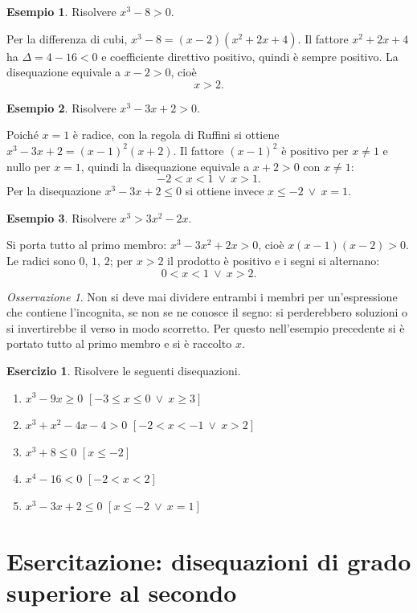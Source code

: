 \documentclass[12pt,a4paper,openany]{book}
\theoremstyle{definition}
\newtheorem{esempio}{Esempio}[section]
\newtheorem{esercizio}{Esercizio}[section]
\theoremstyle{plain}
\theoremstyle{remark}
\newtheorem*{osservazione}{Osservazione}
\begin{document}
\begin{esempio}
Risolvere $x^3-8>0$.

Per la differenza di cubi, $x^3-8=(x-2)(x^2+2x+4)$. Il fattore $x^2+2x+4$ ha $\Delta=4-16<0$ e coefficiente direttivo positivo, quindi è sempre positivo. La disequazione equivale a $x-2>0$, cioè
\[
x>2.
\]
\end{esempio}

\begin{esempio}
Risolvere $x^3-3x+2>0$.

Poiché $x=1$ è radice, con la regola di Ruffini si ottiene $x^3-3x+2=(x-1)^2(x+2)$. Il fattore $(x-1)^2$ è positivo per $x\neq 1$ e nullo per $x=1$, quindi la disequazione equivale a $x+2>0$ con $x\neq 1$:
\[
-2<x<1\ \lor\ x>1.
\]
Per la disequazione $x^3-3x+2\le 0$ si ottiene invece $x\le -2\ \lor\ x=1$.
\end{esempio}

\begin{esempio}
Risolvere $x^3>3x^2-2x$.

Si porta tutto al primo membro: $x^3-3x^2+2x>0$, cioè $x(x-1)(x-2)>0$. Le radici sono $0$, $1$, $2$; per $x>2$ il prodotto è positivo e i segni si alternano:
\[
0<x<1\ \lor\ x>2.
\]
\end{esempio}

\begin{osservazione}
Non si deve mai dividere entrambi i membri per un'espressione che contiene l'incognita, se non se ne conosce il segno: si perderebbero soluzioni o si invertirebbe il verso in modo scorretto. Per questo nell'esempio precedente si è portato tutto al primo membro e si è raccolto $x$.
\end{osservazione}

\begin{esercizio}
Risolvere le seguenti disequazioni.
\begin{enumerate}[label=\alph*)]
\item $x^3-9x\ge 0$ \hfill $[-3\le x\le 0\ \lor\ x\ge 3]$
\item $x^3+x^2-4x-4>0$ \hfill $[-2<x<-1\ \lor\ x>2]$
\item $x^3+8\le 0$ \hfill $[x\le -2]$
\item $x^4-16<0$ \hfill $[-2<x<2]$
\item $x^3-3x+2\le 0$ \hfill $[x\le -2\ \lor\ x=1]$
\end{enumerate}
\end{esercizio}

\section{Esercitazione: disequazioni di grado superiore al secondo}
\end{document}
